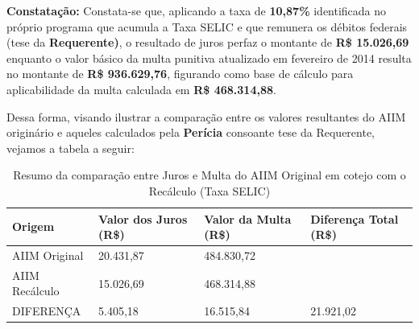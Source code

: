 \begin{table}[h!]
    \centering
    \caption{Recálculo do Anexo ao AIIM n° 4.037.656-4 em 26/02/2014}
    \label{tab:my_label}
\end{table}

\textbf{Constatação:} Constata-se que, aplicando a taxa de \textbf{10,87\%} identificada no próprio programa que acumula a Taxa SELIC e que remunera os débitos federais (tese da \textbf{Requerente)}, o resultado de juros perfaz o montante de \textbf{R\$ 15.026,69} enquanto o valor básico da multa punitiva atualizado em fevereiro de 2014 resulta no montante de
\textbf{R\$ 936.629,76}, figurando como base de cálculo para aplicabilidade da multa calculada em \textbf{R\$ 468.314,88}.

Dessa forma, visando ilustrar a comparação entre os valores resultantes do AIIM originário e aqueles calculados pela \textbf{Perícia} consoante tese da Requerente, vejamos a tabela a seguir:

\hypertarget{tab3}{}
\begin{table}[h!]
    \centering
    \begin{tabular}{|m{2cm}|m{2cm}|m{1.7cm}|m{1.5cm}|}
        \hline
        Origem & Valor dos Juros (R\$) & Valor da Multa (R\$) & Diferença Total (R\$) \\ \hline
        
        AIIM Original & 20.431,87 & 484.830,72 & \\ \hline
        
        AIIM Recálculo & 15.026,69 & 468.314,88 & \\ \hline
        
        DIFERENÇA & 5.405,18 & 16.515,84 & 21.921,02 \\ \hline
    \end{tabular}
    \caption{Resumo da comparação entre Juros e Multa do AIIM Original em cotejo com o Recálculo (Taxa SELIC)}
    \label{tab:my_label}
\end{table}

